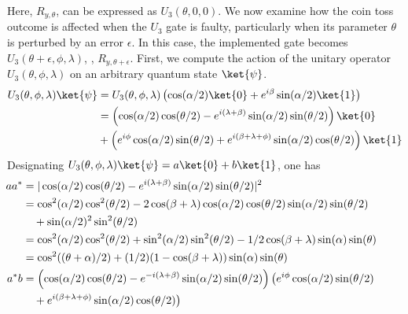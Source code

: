 \begin{example} 
Here, \( R_{y,\theta} \), can be expressed as \( U_3(\theta, 0, 0) \). We now examine how the coin toss outcome is affected when the \( U_3 \) gate is faulty, particularly when its parameter \( \theta \) is perturbed by an error \( \epsilon \). In this case, the implemented gate becomes \( U_3(\theta + \epsilon, \phi, \lambda) \), \ie, $R_{y,\theta+\epsilon}$.
First, we compute the action of the unitary operator \( U_3(\theta, \phi, \lambda) \) on an arbitrary quantum state \( \ket{\psi} \).
\begin{align*}
  U_3(\theta, \phi, \lambda) \ket{\psi} 
  & = U_3(\theta, \phi, \lambda) \left(\cos(\alpha/2) \ket{0} + e^{i\beta}\sin(\alpha/2) \ket{1} \right)\\
  & = \left(\cos(\alpha/2) \cos(\theta/2) - e^{i (\lambda + \beta)}  \sin(\alpha/2)\sin(\theta/2) \right) \ket{0} \\
  & + \left(e^{i \phi}\cos(\alpha/2)\sin(\theta/2) + e^{i (\beta + \lambda + \phi)} \sin(\alpha/2) \cos(\theta/2 ) \right) \ket{1}
\end{align*}
Designating $U_3(\theta, \phi, \lambda) \ket{\psi} = a \ket{0} + b \ket{1}$, one has
\begin{align*}
  \hspace{-25pt} a a^* &= \vert \cos(\alpha/2) \cos(\theta/2) - e^{i (\lambda + \beta) }  \sin(\alpha/2)\sin(\theta/2) \vert ^2 \\
  \hspace{-25pt} & = \cos^2(\alpha/2) \cos^2(\theta/2) - 2 \cos(\beta + \lambda) \cos(\alpha/2) \cos(\theta/2)  \sin(\alpha/2)\sin(\theta/2)  \\
  \hspace{-25pt} & \hspace{10pt} + \sin(\alpha/2)^2 \sin^2(\theta/2) \\
  \hspace{-25pt} & = \cos^2(\alpha/2) \cos^2(\theta/2) + \sin^2(\alpha/2) \sin^2(\theta/2)  - 1/2 \cos(\beta + \lambda) \sin(\alpha)\sin(\theta) \\
  \hspace{-25pt} & = \cos^2((\theta+\alpha)/2)+ (1/2) (1-\cos(\beta + \lambda))\sin(\alpha)\sin(\theta)  \\
  \hspace{-25pt} a^*b & = \left(\cos(\alpha/2) \cos(\theta/2) - e^{-i (\lambda + \beta)}  \sin(\alpha/2)\sin(\theta/2) \right) \big(e^{i \phi}\cos(\alpha/2)\sin(\theta/2) \\
  \hspace{-25pt} & \hspace{10pt}  + e^{i (\beta + \lambda + \phi)} \sin(\alpha/2) \cos(\theta/2 ) \big) \\

\end{align*}
\end{example}
